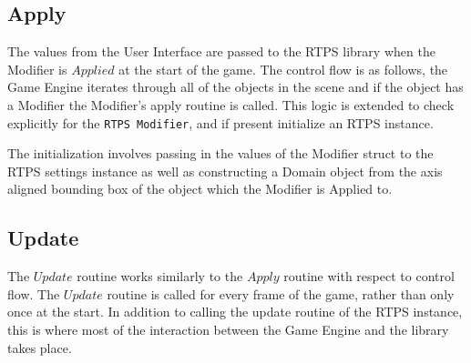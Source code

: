 \subsection{Apply}
The values from the User Interface are passed to the RTPS library when the
Modifier is $Applied$ at the start of the game. The control flow is as follows,
the Game Engine iterates through all of the objects in the scene and if the
object has a Modifier the Modifier's apply routine is called. This logic is
extended to check explicitly for the \verb|RTPS Modifier|, and if present initialize
an RTPS instance.


The initialization involves passing in the values of the Modifier struct to the
RTPS settings instance as well as constructing a Domain object from the axis
aligned bounding box of the object which the Modifier is Applied to.

\subsection{Update}

The $Update$ routine works similarly to the $Apply$ routine with respect to control
flow. The $Update$ routine is called for every frame of the game, rather than
only once at the start. In addition to calling the update routine of the RTPS
instance, this is where most of the interaction between the Game Engine and the
library takes place.

